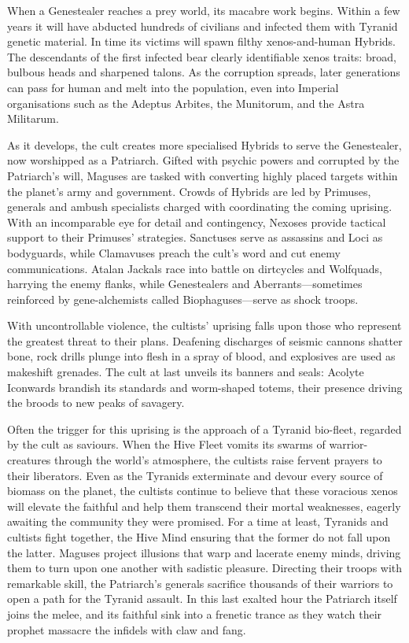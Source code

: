 When a Genestealer reaches a prey world, its macabre work begins. Within a few years it will have abducted hundreds of civilians and infected them with Tyranid genetic material. In time its victims will spawn filthy xenos-and-human Hybrids. The descendants of the first infected bear clearly identifiable xenos traits: broad, bulbous heads and sharpened talons. As the corruption spreads, later generations can pass for human and melt into the population, even into Imperial organisations such as the Adeptus Arbites, the Munitorum, and the Astra Militarum.

As it develops, the cult creates more specialised Hybrids to serve the Genestealer, now worshipped as a Patriarch. Gifted with psychic powers and corrupted by the Patriarch's will, Maguses are tasked with converting highly placed targets within the planet's army and government. Crowds of Hybrids are led by Primuses, generals and ambush specialists charged with coordinating the coming uprising. With an incomparable eye for detail and contingency, Nexoses provide tactical support to their Primuses' strategies. Sanctuses serve as assassins and Loci as bodyguards, while Clamavuses preach the cult's word and cut enemy communications. Atalan Jackals race into battle on dirtcycles and Wolfquads, harrying the enemy flanks, while Genestealers and Aberrants---sometimes reinforced by gene-alchemists called Biophaguses---serve as shock troops.

With uncontrollable violence, the cultists' uprising falls upon those who represent the greatest threat to their plans. Deafening discharges of seismic cannons shatter bone, rock drills plunge into flesh in a spray of blood, and explosives are used as makeshift grenades. The cult at last unveils its banners and seals: Acolyte Iconwards brandish its standards and worm-shaped totems, their presence driving the broods to new peaks of savagery.

Often the trigger for this uprising is the approach of a Tyranid bio-fleet, regarded by the cult as saviours. When the Hive Fleet vomits its swarms of warrior-creatures through the world's atmosphere, the cultists raise fervent prayers to their liberators. Even as the Tyranids exterminate and devour every source of biomass on the planet, the cultists continue to believe that these voracious xenos will elevate the faithful and help them transcend their mortal weaknesses, eagerly awaiting the community they were promised. For a time at least, Tyranids and cultists fight together, the Hive Mind ensuring that the former do not fall upon the latter. Maguses project illusions that warp and lacerate enemy minds, driving them to turn upon one another with sadistic pleasure. Directing their troops with remarkable skill, the Patriarch's generals sacrifice thousands of their warriors to open a path for the Tyranid assault. In this last exalted hour the Patriarch itself joins the melee, and its faithful sink into a frenetic trance as they watch their prophet massacre the infidels with claw and fang.

